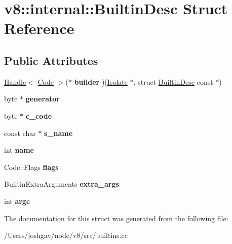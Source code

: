 \hypertarget{structv8_1_1internal_1_1_builtin_desc}{}\section{v8\+:\+:internal\+:\+:Builtin\+Desc Struct Reference}
\label{structv8_1_1internal_1_1_builtin_desc}
\subsection*{Public Attributes}
\begin{DoxyCompactItemize}
\item 
\hyperlink{classv8_1_1internal_1_1_handle}{Handle}$<$ \hyperlink{classv8_1_1internal_1_1_code}{Code} $>$($\ast$ {\bfseries builder} )(\hyperlink{classv8_1_1internal_1_1_isolate}{Isolate} $\ast$, struct \hyperlink{structv8_1_1internal_1_1_builtin_desc}{Builtin\+Desc} const $\ast$)\hypertarget{structv8_1_1internal_1_1_builtin_desc_a3de78d71c5beb9e9c8723589fc76cd20}{}\label{structv8_1_1internal_1_1_builtin_desc_a3de78d71c5beb9e9c8723589fc76cd20}

\item 
byte $\ast$ {\bfseries generator}\hypertarget{structv8_1_1internal_1_1_builtin_desc_a8d9840427cd826f45dec70609105ba37}{}\label{structv8_1_1internal_1_1_builtin_desc_a8d9840427cd826f45dec70609105ba37}

\item 
byte $\ast$ {\bfseries c\+\_\+code}\hypertarget{structv8_1_1internal_1_1_builtin_desc_a166adea6c36f33103818b4e4f1f2e79e}{}\label{structv8_1_1internal_1_1_builtin_desc_a166adea6c36f33103818b4e4f1f2e79e}

\item 
const char $\ast$ {\bfseries s\+\_\+name}\hypertarget{structv8_1_1internal_1_1_builtin_desc_a2d6009bad9ff4adcd8a5ed9d5b9bf81a}{}\label{structv8_1_1internal_1_1_builtin_desc_a2d6009bad9ff4adcd8a5ed9d5b9bf81a}

\item 
int {\bfseries name}\hypertarget{structv8_1_1internal_1_1_builtin_desc_ac5f39ddcf768e3708f9be037d8cb2d3c}{}\label{structv8_1_1internal_1_1_builtin_desc_ac5f39ddcf768e3708f9be037d8cb2d3c}

\item 
Code\+::\+Flags {\bfseries flags}\hypertarget{structv8_1_1internal_1_1_builtin_desc_a43b6bda5f3635c550f28b68083399e0d}{}\label{structv8_1_1internal_1_1_builtin_desc_a43b6bda5f3635c550f28b68083399e0d}

\item 
Builtin\+Extra\+Arguments {\bfseries extra\+\_\+args}\hypertarget{structv8_1_1internal_1_1_builtin_desc_a5e6594d6eee0954262806528f6b629d5}{}\label{structv8_1_1internal_1_1_builtin_desc_a5e6594d6eee0954262806528f6b629d5}

\item 
int {\bfseries argc}\hypertarget{structv8_1_1internal_1_1_builtin_desc_a4605aa36303175cfdb920fa7a9615100}{}\label{structv8_1_1internal_1_1_builtin_desc_a4605aa36303175cfdb920fa7a9615100}

\end{DoxyCompactItemize}


The documentation for this struct was generated from the following file\+:\begin{DoxyCompactItemize}
\item 
/\+Users/joshgav/node/v8/src/builtins.\+cc\end{DoxyCompactItemize}
